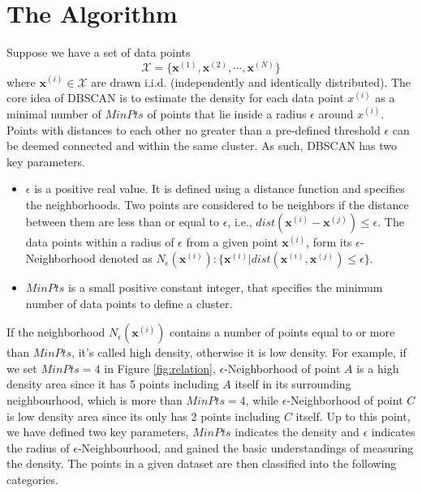 \section{The Algorithm}

Suppose we have a set of data points \[\mathcal{X} = 
\{\mathbf{x}^{(1)},\mathbf{x}^{(2)},\cdots,\mathbf{x}^{(N)}\}\]
\noindent where $\mathbf{x}^{(i)} \in \mathcal{X}$ are drawn i.i.d. 
(independently and identically distributed).  The core idea of DBSCAN is to 
estimate the density for each data point $x^{(i)}$ as a minimal number of 
$MinPts$ of points that lie inside a radius $\epsilon$ around $x^{(i)}$. 
Points with distances to each other no greater than a pre-defined threshold $\epsilon$ can be deemed connected and within the same cluster.
As such, DBSCAN has two key parameters. 

\begin{itemize}
	\item{$\epsilon$} is a positive real value. It is defined using a distance 
	function and specifies the neighborhoods. Two points are considered to be 
	neighbors if the distance between them are less than or equal to 
	$\epsilon$, i.e., $dist(\mathbf{x}^{(i)} - \mathbf{x}^{(j)}) \leq \epsilon$. The data 
	points within a radius of $\epsilon$ from a given point $\mathbf{x}^{(i)}$, 
	form its $\epsilon$-Neighborhood denoted as 
	$\mathit{N_{\epsilon}(\mathbf{x}^{(i)}):\{\mathbf{x}^{(i)}| 
	dist(\mathbf{x}^{(i)}, \mathbf{x}^{(j)})\leq \epsilon\}}$.
	
	\item{$MinPts$} is a small positive constant integer, that specifies the 
	minimum number of data points to define a cluster.	
\end{itemize}

If the neighborhood $N_{\epsilon}(\mathbf{x}^{(i)})$ contains a number of points equal to or more than $MinPts$, it's called high density, otherwise it is low density. For example, 
if we set $MinPts = 4$ in Figure \ref{fig:relation}, 
$\epsilon$-Neighborhood of point $A$ is a high density area since it has 5 
points including $A$ itself in its surrounding neighbourhood, which is more 
than $MinPts = 4$, while $\epsilon$-Neighborhood of point $C$ is low density 
area since its only has 2 points including $C$ itself. Up to this point, we have defined two key parameters, $MinPts$ indicates the  density and $\epsilon$ indicates the radius of $\epsilon$-Neighbourhood, and  gained the 
basic understandings of measuring the density. The points in a given dataset 
are then classified into the following categories. 


